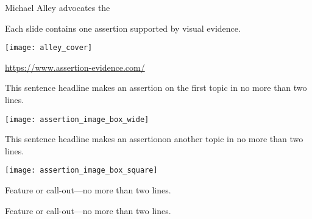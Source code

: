 \documentclass[t]{beamer}
\begin{document}
%


%

\begin{frame}[t]{Michael Alley advocates the }
\begin{multicols}{2}

\hangpara Each slide contains one assertion supported by visual evidence.

\columnbreak

\texttt{[image: alley\_cover]}

\end{multicols}

\vfilll

\tiny \url{https://www.assertion-evidence.com/}

\end{frame}

\begin{frame}[t]{This sentence headline makes an assertion on the first topic in no more than two lines.}

\begin{center}
\texttt{[image: assertion\_image\_box\_wide]}
\end{center}


\end{frame}

\begin{frame}[t]{This sentence headline makes an assertion\newline on another topic in no more than two lines.}

\begin{multicols}{2}
\begin{center}
\texttt{[image: assertion\_image\_box\_square]}
\end{center}

\columnbreak

Feature or call-out—no more than two lines.

\vspace{8\baselineskip}

Feature or call-out—no more than two lines.

\end{multicols}


\end{frame}
\end{document}

